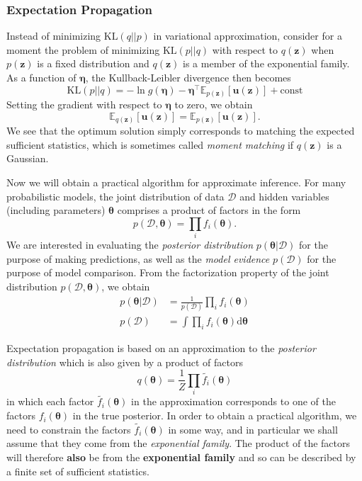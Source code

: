 \documentclass[a4paper]{book}
\newcommand{\ud}{\mathrm{d}}
\newcommand{\up}{\mathrm}
\renewcommand{\bf}{\mathbf}
\renewcommand{\cal}{\mathcal}
\newcommand{\bb}{\mathbb}
\newcommand{\imp}[1]{\textit{#1}}
\newcommand{\bs}{\boldsymbol}
\begin{document}
\subsubsection{Expectation Propagation}
Instead of minimizing $\up{KL}(q||p)$ in variational approximation, consider for a moment the problem of minimizing $\up{KL}(p||q)$ with respect to $q(\bf{z})$ when $p(\bf{z})$ is a fixed distribution and $q(\bf{z})$ is a member of the exponential family. As a function of $\bs{\eta}$, the Kullback-Leibler divergence then becomes
\begin{equation}
	\up{KL}(p||q) = -\ln g(\bs{\eta}) - \bs{\eta}^{\intercal} \bb{E}_{p(\bf{z})}[\bf{u(z)}] + \up{const}
\end{equation}
Setting the gradient with respect to $\bs{\eta}$ to zero, we obtain
\begin{equation}
	\bb{E}_{q(\bf{z})}[\bf{u(z)}] = \bb{E}_{p(\bf{z})}[\bf{u(z)}].
\end{equation}
We see that the optimum solution simply corresponds to matching the expected sufficient statistics, which is sometimes called \imp{moment matching} if $q(\bf{z})$ is a Gaussian.

Now we will obtain a practical algorithm for approximate inference. For many probabilistic models, the joint distribution of data $\cal{D}$ and hidden variables (including parameters) $\bs{\theta}$ comprises a product of factors in the form
\begin{equation}
	p(\cal{D},\bs{\theta}) = \prod_i f_i(\bs{\theta}).
\end{equation}
We are interested in evaluating the \imp{posterior distribution} $p(\bs{\theta}|\cal{D})$ for the purpose of making predictions, as well as the \imp{model evidence} $p(\cal{D})$ for the purpose of model comparison. From the factorization property of the joint distribution $p(\cal{D},\bs{\theta})$, we obtain
\begin{align}
	p(\bs{\theta}|\cal{D}) &= \frac{1}{p(\cal{D})} \prod_i f_i(\bs{\theta}) \\
	p(\cal{D}) &= \int \prod_i f_i(\bs{\theta}) \ud \bs{\theta}
\end{align}

Expectation propagation is based on an approximation to the \imp{posterior distribution} which is also given by a product of factors
\begin{equation}
	q(\bs{\theta}) = \frac{1}{Z} \prod_i \tilde{f_i}(\bs{\theta})
\end{equation}
in which each factor $\tilde{f_i}(\bs{\theta})$ in the approximation corresponds to one of the factors $f_i(\bs{\theta})$ in the true posterior. In order to obtain a practical algorithm, we need to constrain the factors $\tilde{f_i}(\bs{\theta})$ in some way, and in particular we shall assume that they come from the \emph{exponential family}. The product of the factors will therefore \textbf{also} be from the \textbf{exponential family} and so can be described by a finite set of sufficient statistics. 
\end{document}
